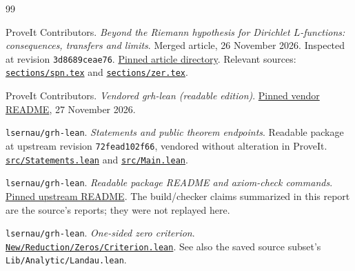 {}
\begin{thebibliography}{99}

ProveIt Contributors.
\emph{Beyond the Riemann hypothesis for Dirichlet \(L\)-functions:
consequences, transfers and limits}.
Merged article, 26 November 2026.
Inspected at revision \texttt{3d8689ceae76}.
\href{https://github.com/VladimirReshetnikov/ProveIt/tree/3d8689ceae76501a5c50f67da37e85369aac4fb6/Analysis/GeneralizedRiemannHypothesis/Article}{Pinned article directory}.
Relevant sources:
\href{https://github.com/VladimirReshetnikov/ProveIt/blob/3d8689ceae76501a5c50f67da37e85369aac4fb6/Analysis/GeneralizedRiemannHypothesis/Article/sections/spn.tex}{\texttt{sections/spn.tex}} and
\href{https://github.com/VladimirReshetnikov/ProveIt/blob/3d8689ceae76501a5c50f67da37e85369aac4fb6/Analysis/GeneralizedRiemannHypothesis/Article/sections/zer.tex}{\texttt{sections/zer.tex}}.

ProveIt Contributors.
\emph{Vendored grh-lean (readable edition)}.
\href{https://github.com/VladimirReshetnikov/ProveIt/blob/3d8689ceae76501a5c50f67da37e85369aac4fb6/Analysis/GeneralizedRiemannHypothesis/vendor/grh-lean/README.md}{Pinned vendor README}, 27 November 2026.

\texttt{lsernau/grh-lean}.
\emph{Statements and public theorem endpoints}.
Readable package at upstream revision \texttt{72fead102f66},
vendored without alteration in ProveIt.
\href{https://github.com/VladimirReshetnikov/ProveIt/blob/3d8689ceae76501a5c50f67da37e85369aac4fb6/Analysis/GeneralizedRiemannHypothesis/vendor/grh-lean/grh/src/Statements.lean}{\texttt{src/Statements.lean}} and
\href{https://github.com/VladimirReshetnikov/ProveIt/blob/3d8689ceae76501a5c50f67da37e85369aac4fb6/Analysis/GeneralizedRiemannHypothesis/vendor/grh-lean/grh/src/Main.lean}{\texttt{src/Main.lean}}.

\texttt{lsernau/grh-lean}.
\emph{Readable package README and axiom-check commands}.
\href{https://github.com/VladimirReshetnikov/ProveIt/blob/3d8689ceae76501a5c50f67da37e85369aac4fb6/Analysis/GeneralizedRiemannHypothesis/vendor/grh-lean/grh/README.md}{Pinned upstream README}.
The build/checker claims summarized in this report are the source's reports;
they were not replayed here.

\texttt{lsernau/grh-lean}.
\emph{One-sided zero criterion}.
\href{https://github.com/VladimirReshetnikov/ProveIt/blob/3d8689ceae76501a5c50f67da37e85369aac4fb6/Analysis/GeneralizedRiemannHypothesis/vendor/grh-lean/grh/src/New/Reduction/Zeros/Criterion.lean}{\texttt{New/Reduction/Zeros/Criterion.lean}}.
See also the saved source subset's \texttt{Lib/Analytic/Landau.lean}.


\end{thebibliography}
